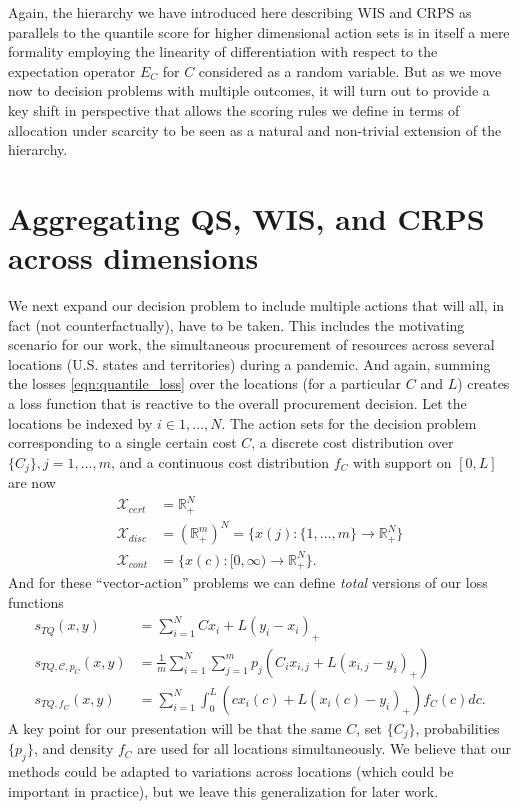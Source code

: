 \documentclass{article}
\begin{document}
Again, the hierarchy we have introduced here describing WIS and CRPS as parallels to the quantile score for higher dimensional action sets is in itself a mere formality employing the linearity of differentiation with respect to the expectation operator $E_{C}$ for $C$ considered as a random variable. But as we move now to decision problems with multiple outcomes, it will turn out to provide a key shift in perspective that allows the scoring rules we define in terms of allocation under scarcity to be seen as a natural and non-trivial extension of the hierarchy. 


\section{Aggregating QS, WIS, and CRPS across dimensions}

We next expand our decision problem to include multiple actions that will all, in fact (not counterfactually), have to be taken.  This includes the motivating scenario for our work, the simultaneous procurement of resources across several locations (U.S. states and territories) during a pandemic. And again, summing the losses  \eqref{eqn:quantile_loss} over the locations (for a particular $C$ and $L$) creates a loss function that is reactive to the overall procurement decision. Let the locations be indexed by $i \in 1,\ldots,N$.  The action sets for the decision problem corresponding to a single certain cost $C$, a discrete cost distribution over $\{C_j\}, j = 1,\ldots,m$, and a continuous cost distribution $f_C$ with support on $[0,L]$ are now
\begin{align}
\mathcal{X}_{cert} &= \mathbb{R}_{+}^N \\
\mathcal{X}_{disc} &= (\mathbb{R}_{+}^m)^N = \{x(j):\{1,\ldots,m\} \to \mathbb{R}_{+}^N\}\\
\mathcal{X}_{cont} &= \{x(c):[0,\infty) \to \mathbb{R}_{+}^N\}.
\end{align}
And for these ``vector-action'' problems we can define \emph{total} versions of our loss functions
\begin{align}
s_{TQ}(x,y) &= \sum_{i=1}^N Cx_i + L(y_i-x_i)_+ \label{eqn:TQ_loss} \\
s_{TQ, \mathcal{C}, p_C}(x,y) &= \frac{1}{m}\sum_{i=1}^N \sum_{j=1}^{m}p_j(C_i x_{i,j} + L(x_{i,j} - y_i)_+)\\
s_{TQ, f_C}(x,y) &= \sum_{i=1}^N \int_{0}^{L} (cx_i(c) + L(x_i(c) - y_i)_+) f_C(c)dc.
\end{align}
A key point for our presentation will be that the same $C$, set $\{C_j\}$, probabilities $\{p_j\}$, and density $f_C$ are used for all locations simultaneously.  We believe that our methods could be adapted to variations across locations (which could be important in practice), but we leave this generalization for later work. 
\end{document}
